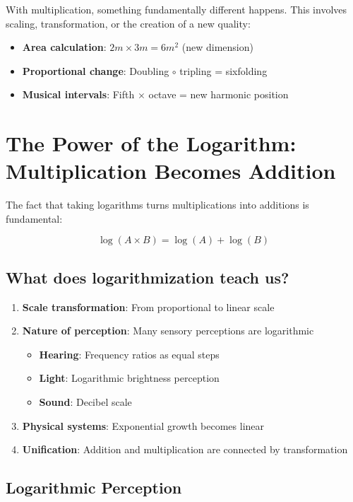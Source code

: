 	With multiplication, something fundamentally different happens. This involves scaling, transformation, or the creation of a new quality:
	
	\begin{itemize}
		\item \textbf{Area calculation}: $2m \times 3m = 6m^2$ (new dimension)
		\item \textbf{Proportional change}: Doubling $\circ$ tripling = sixfolding
		\item \textbf{Musical intervals}: Fifth $\times$ octave = new harmonic position
	\end{itemize}
	
	\section{The Power of the Logarithm: Multiplication Becomes Addition}
	
	The fact that taking logarithms turns multiplications into additions is fundamental:
	
	\begin{equation}
		\log(A \times B) = \log(A) + \log(B)
	\end{equation}
	
	\subsection{What does logarithmization teach us?}
	
	\begin{enumerate}
		\item \textbf{Scale transformation}: From proportional to linear scale
		\item \textbf{Nature of perception}: Many sensory perceptions are logarithmic
		\begin{itemize}
			\item \textbf{Hearing}: Frequency ratios as equal steps
			\item \textbf{Light}: Logarithmic brightness perception
			\item \textbf{Sound}: Decibel scale
		\end{itemize}
		\item \textbf{Physical systems}: Exponential growth becomes linear
		\item \textbf{Unification}: Addition and multiplication are connected by transformation
	\end{enumerate}
	
	\subsection{Logarithmic Perception}
	
